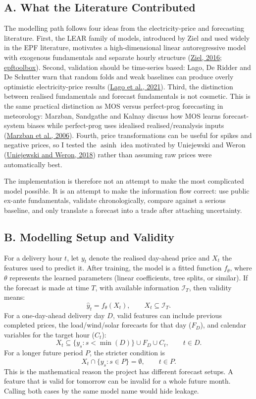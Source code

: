 \documentclass[10pt,a4paper]{article}
\begin{document}
\subsection*{A. What the Literature Contributed}
The modelling path follows four ideas from the electricity-price and forecasting literature. First, the LEAR family of models, introduced by Ziel and used widely in the EPF literature, motivates a high-dimensional linear autoregressive model with exogenous fundamentals and separate hourly structure (\href{https://arxiv.org/abs/1509.01966}{Ziel, 2016}; \href{https://epftoolbox.readthedocs.io/en/latest/modules/lear_model.html}{epftoolbox}). Second, validation should be time-series based: Lago, De Ridder and De Schutter warn that random folds and weak baselines can produce overly optimistic electricity-price results (\href{https://arxiv.org/abs/2008.08004}{Lago et al., 2021}). Third, the distinction between realised fundamentals and forecast fundamentals is not cosmetic. This is the same practical distinction as MOS versus perfect-prog forecasting in meteorology: Marzban, Sandgathe and Kalnay discuss how MOS learns forecast-system biases while perfect-prog uses idealised realised/reanalysis inputs (\href{https://faculty.washington.edu/marzban/mos.pdf}{Marzban et al., 2006}). Fourth, price transformations can be useful for spikes and negative prices, so I tested the $\operatorname{asinh}$ idea motivated by Uniejewski and Weron (\href{https://www.mdpi.com/1996-1073/11/8/2039}{Uniejewski and Weron, 2018}) rather than assuming raw prices were automatically best.

The implementation is therefore not an attempt to make the most complicated model possible. It is an attempt to make the information flow correct: use public ex-ante fundamentals, validate chronologically, compare against a serious baseline, and only translate a forecast into a trade after attaching uncertainty.

\subsection*{B. Modelling Setup and Validity}
For a delivery hour $t$, let $y_t$ denote the realised day-ahead price and $X_t$ the features used to predict it. After training, the model is a fitted function $f_\theta$, where $\theta$ represents the learned parameters (linear coefficients, tree splits, or similar). If the forecast is made at time $T$, with available information $\mathcal{I}_T$, then validity means:
\[
  \hat{y}_t=f_\theta(X_t),
  \qquad
  X_t\subseteq\mathcal{I}_T.
\]
For a one-day-ahead delivery day $D$, valid features can include previous completed prices, the load/wind/solar forecasts for that day ($F_D$), and calendar variables for the target hour ($C_t$):
\[
  X_t\subseteq \{y_s:s<\min(D)\}\cup F_D\cup C_t,
  \qquad t\in D.
\]
For a longer future period $P$, the stricter condition is
\[
  X_t\cap\{y_s:s\in P\}=\emptyset,
  \qquad t\in P.
\]
This is the mathematical reason the project has different forecast setups. A feature that is valid for tomorrow can be invalid for a whole future month. Calling both cases by the same model name would hide leakage.
\end{document}

